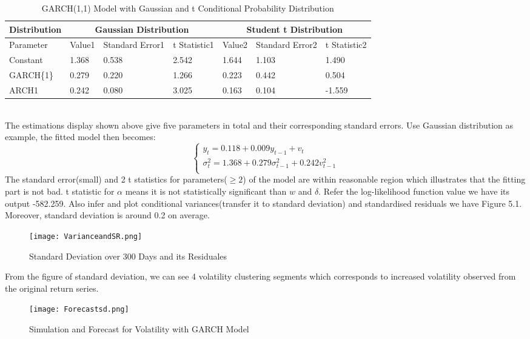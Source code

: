 \begin{table}[h!]
\centering
\caption{GARCH(1,1) Model with Gaussian and t Conditional Probability Distribution}
\begin{tabular}{ |p{2cm}|p{1.3cm}|p{1.5cm}|p{1.5cm}|p{1.3cm}|p{1.5cm}|p{1.5cm}|}
 \hline
Distribution& \multicolumn{3}{|c|}{Gaussian Distribution}&\multicolumn{3}{|c|}{Student t Distribution} \\
 \hline
Parameter&Value1&Standard Error1&t Statistic1&Value2&Standard Error2&t Statistic2\\
 \hline
Constant&1.368&0.538&2.542&1.644&1.103&1.490\\
GARCH\{1\}&0.279&0.220&1.266&0.223&0.442&0.504\\
ARCH{1}&0.242&0.080&3.025&0.163&0.104&-1.559\\
 \hline
\end{tabular}
\end{table}
\\
The estimations display shown above give five parameters in total and their corresponding standard errors. Use Gaussian distribution as example, the fitted model then becomes:
\begin{equation}
  \begin{cases}
y_t=0.118+0.009y_{t-1}+v_t  \\
 \sigma_t^2=1.368+0.279\sigma_{t-1}^2+0.242v_{t-1}^2 \\
  \end{cases}\nonumber
\end{equation}
The standard error(small) and 2 t statistics for parameters($\geq2$) of the model are within reasonable region which illustrates that the fitting part is not bad. t statistic for $\alpha$ means it is not statistically significant than $w$ and $\delta$. Refer the log-likelihood function value we have its output -582.259. Also infer and plot conditional variances(transfer it to standard deviation) and standardised residuals we have Figure 5.1. Moreover, standard deviation is around 0.2 on average. 
\begin{figure}[t!]
  \centering
  \texttt{[image: VarianceandSR.png]}
  \caption{Standard Deviation over 300 Days and its Residuales \label{fig:scaled_diss}}
\end{figure}
From the figure of standard deviation, we can see 4 volatility clustering segments which corresponds to increased volatility observed from the original return series. 
\begin{figure}[b!]
  \centering
  \texttt{[image: Forecastsd.png]}
  \caption{Simulation and Forecast for Volatility with GARCH Model \label{fig:scaled_diss}}
\end{figure}
